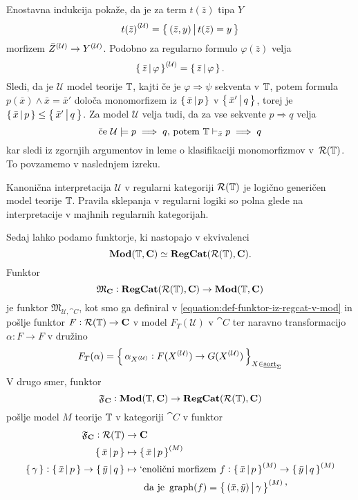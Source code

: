 \documentclass[../kategoricna_logika.tex]{subfiles}
\begin{document}
Enostavna indukcija pokaže, da je za term
$t(\bar{z})$ tipa $Y$
$${t(\bar{z})}^{(\mathcal{U})} = \left\lbrace\,(\bar{z},y)\,\middle|\, t(\bar{z}) = y\,\right\rbrace$$
morfizem ${\bar{Z}}^{(\mathcal{U})} \to {Y}^{(\mathcal{U})}$. Podobno za regularno
formulo $\varphi(\bar{z})$ velja
$${\left\lbrace\,\bar{z}\,\middle|\, \varphi\,\right\rbrace}^{(\mathcal{U})} = \left\lbrace\,\bar{z}\,\middle|\, \varphi\,\right\rbrace.$$
Sledi, da je $\mathcal{U}$ model teorije $\mathbb{T}$, kajti če je
$\varphi \Rightarrow \psi$ sekventa v $\mathbb{T}$, potem formula
$p(\bar{x}) \wedge \bar{x}= \bar{x}'$
določa monomorfizem iz $\left\lbrace\,\bar{x}\,\middle|\, p\,\right\rbrace$ v
$\left\lbrace\,\bar{x}'\,\middle|\, q\,\right\rbrace$, torej je
$\left\lbrace\,\bar{x}\,\middle|\, p\,\right\rbrace \leq \left\lbrace\,\bar{x}'\,\middle|\, q\,\right\rbrace$.  Za
model $\mathcal{U}$ velja tudi, da za vse sekvente $p \Rightarrow q$ velja
$$\text{če} \ \mathcal{U} \models p \implies q \text{, potem} \ \mathbb{T} \vdash_{\bar{x}} p \implies q$$
kar sledi iz zgornjih argumentov in leme o klasifikaciji
monomorfizmov v~$\mathcal{R}(\mathbb{T})$.  To povzamemo v naslednjem izreku.
\begin{izrek}
  Kanonična interpretacija $\mathcal{U}$ v regularni kategoriji
  $\mathcal{R}(\mathbb{T})$ je logično generičen model teorije $\mathbb{T}$. Pravila
  sklepanja v regularni logiki so polna glede na interpretacije v
  majhnih regularnih kategorijah.
\end{izrek}
Sedaj lahko podamo funktorje, ki nastopajo v ekvivalenci
$$\mathbf{Mod}(\mathbb{T}, {\operatorname{\mathbf{C}}}) \simeq {\operatorname{\mathbf{RegCat}}}(\mathcal{R}(\mathbb{T}), {\operatorname{\mathbf{C}}}).$$
Funktor
$$\mathfrak{M}_{{\operatorname{\mathbf{C}}}} : {\operatorname{\mathbf{RegCat}}}(\mathcal{R}(\mathbb{T}), {\operatorname{\mathbf{C}}}) \to \mathbf{Mod}(\mathbb{T}, {\operatorname{\mathbf{C}}})$$
je funktor $\mathfrak{M}_{\mathcal{U}, \cat{C}}$, kot smo ga definiral
v \eqref{equation:def-funktor-iz-regcat-v-mod} in pošlje funktor $F : \mathcal{R}(\mathbb{T}) \to {\operatorname{\mathbf{C}}}$ v
model $F_T(\mathcal{U})$ v $\cat{C}$ ter naravno transformacijo
$\alpha : F \to F$ v družino
$$F_T(\alpha) = \left\lbrace\,\alpha_{{X}^{(\mathcal{U})}} : F({X}^{(\mathcal{U})}) \to G({X}^{(\mathcal{U})})\,\right\rbrace_{X \in \underline{\mathrm{sort}}_{\Sigma}}$$
V drugo smer, funktor
$$\mathfrak{F}_{{\operatorname{\mathbf{C}}}} : \mathbf{Mod}(\mathbb{T}, {\operatorname{\mathbf{C}}}) \to {\operatorname{\mathbf{RegCat}}}(\mathcal{R}(\mathbb{T}), {\operatorname{\mathbf{C}}})$$
pošlje model $M$ teorije $\mathbb{T}$ v kategoriji $\cat{C}$ v funktor
\begin{align*}
  \mathfrak{F}_{\cat{C}} : \mathcal{R}(\T) &\to \cat{C}\\
  \set{\bar{x}\,\middle|\, p} &\mapsto \set{\bar{x}\,\middle|\, p}^{(M)} \\
  \set{\gamma} : \set{\bar{x}\,\middle|\, p} \to \set{\bar{y}\,\middle|\, q} &\mapsto \text{`enolični morfizem} \ f : \set{\bar{x}\,\middle|\, p}^{(M)} \to \set{\bar{y}\,\middle|\, q}^{(M)} \\ 
                                          &\qquad \text{da je} \ \graph(f) = \set{(\bar{x}, \bar{y}) \,\middle|\, \gamma}^{(M)} \text{'}
\end{align*}
\end{document}
